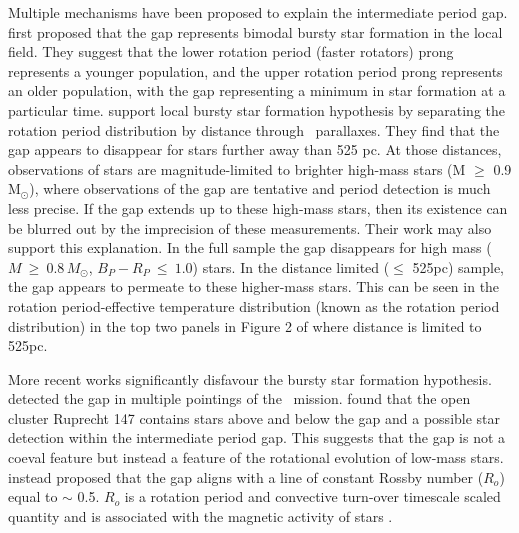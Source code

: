 Multiple mechanisms have been proposed to explain the intermediate period gap.
\citet{mcquillan_rotation_2014} first proposed that the gap represents bimodal bursty star formation in the local \kepler{} field.
They suggest that the lower rotation period (faster rotators) prong represents a younger population, and the upper rotation period prong represents an older population, with the gap representing a minimum in star formation at a particular time.
\citet{davenport_rotating_2018} support local bursty star formation hypothesis by separating the \kepler{} rotation period distribution by distance through \gaia{} \ parallaxes.
They find that the gap appears to disappear for stars further away than 525 pc.
At those distances, observations of stars are magnitude-limited to brighter high-mass stars (M $\geq$ 0.9 M$_{\odot}$), where observations of the gap are tentative and period detection is much less precise.
If the gap extends up to these high-mass stars, then its existence can be blurred out by the imprecision of these measurements.
Their work may also support this explanation.
In the full \citet{mcquillan_rotation_2014} sample the gap disappears for high mass ($M \ \geq \ 0.8 \, M_{\odot}$, $B_P - R_P \ \leq \ 1.0$) stars.
In the distance limited ($\leq$ 525pc) sample, the gap appears to permeate to these higher-mass stars. 
This can be seen in the rotation period-effective temperature distribution (known as the rotation period distribution) in the top two panels in Figure 2 of \citet{davenport_rotating_2018} where distance is limited to 525pc.

More recent works significantly disfavour the bursty star formation hypothesis.
\citet{gordon_stellar_2021} detected the gap in multiple pointings of the \ktoo \ mission. 
\citet{curtis_when_2020} found that the open cluster Ruprecht 147 contains stars above and below the gap and a possible star detection within the intermediate period gap.
This suggests that the gap is not a coeval feature but instead a feature of the rotational evolution of low-mass stars.
\citet{curtis_when_2020} instead proposed that the gap aligns with a line of constant Rossby number ($R_o$) equal to $\sim$ 0.5.
$R_o$ is a rotation period and convective turn-over timescale scaled quantity and is associated with the magnetic activity of stars \citep{brun_stellar_2003,fang_stellar_2018, cao_starspots_2022}.

